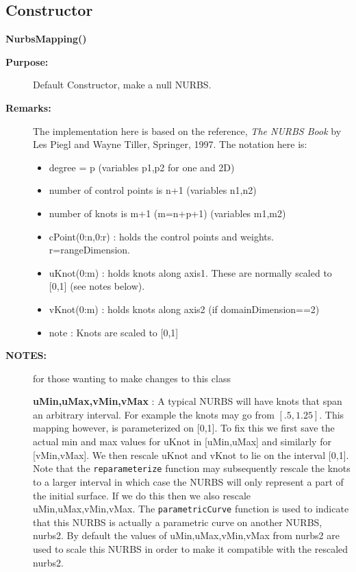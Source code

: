 \subsection{Constructor}
 
\newlength{\NurbsMappingIncludeArgIndent}
\begin{flushleft} \textbf{%
\settowidth{\NurbsMappingIncludeArgIndent}{NurbsMapping(}%
NurbsMapping() 
}\end{flushleft}
\begin{description}
\item[{\bf Purpose:}]  Default Constructor, make a null NURBS. 
\item[{\bf Remarks:}] 
    The implementation here is based on the reference, {\sl The NURBS Book}
 by Les Piegl and Wayne Tiller, Springer, 1997. The notation here is:
 \begin{itemize}
   \item degree = p  (variables p1,p2 for one and 2D)
   \item  number of control points is n+1 (variables n1,n2)
   \item  number of knots is m+1 (m=n+p+1) (variables m1,m2)
   \item cPoint(0:n,0:r) :  holds the control points and weights. r=rangeDimension.
   \item uKnot(0:m) : holds knots along axis1. These are normally scaled to [0,1] (see notes below).
   \item vKnot(0:m) : holds knots along axis2 (if domainDimension==2)  
   \item note : Knots are scaled to [0,1]
 \end{itemize}
 
\item[{\bf NOTES:}]  for those wanting to make changes to this class

   {\bf uMin,uMax,vMin,vMax} : A typical NURBS will have knots that span an arbitrary interval.
     For example the knots may go from $[.5,1.25]$. This mapping however, is parameterized on [0,1].
     To fix this we first save the actual min and max values for uKnot in [uMin,uMax] and similarly
     for [vMin,vMax]. We then rescale uKnot and vKnot to lie on the interval [0,1]. Note that
     the {\tt reparameterize} function may subsequently rescale the knots to a larger interval
     in which case the NURBS will only represent a part of the initial surface. If we do this then
     we also rescale uMin,uMax,vMin,vMax. The {\tt parametricCurve} function is used to indicate
     that this NURBS is actually a parametric curve on another NURBS, nurbs2. By default the values of 
     uMin,uMax,vMin,vMax from nurbs2 are used to scale this NURBS in order to make it compatible with
     the rescaled nurbs2.
     
\end{description}
